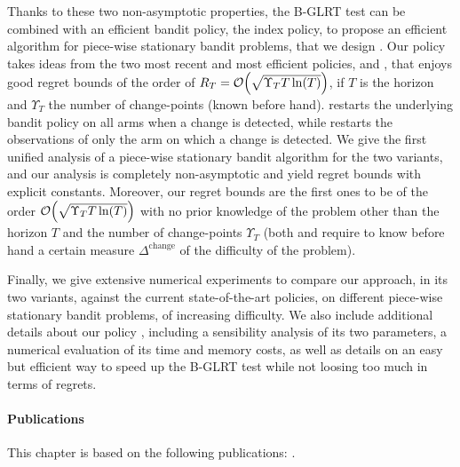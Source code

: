 Thanks to these two non-asymptotic properties, the B-GLRT test can be combined with an efficient bandit policy, the \klUCB{} index policy, to propose an efficient algorithm for piece-wise stationary bandit problems, that we design \GLRklUCB.
Our policy takes ideas from the two most recent and most efficient policies, \CUSUMUCB{} and \MUCB, that enjoys good regret bounds of the order of $R_T = \mathop{}\mathopen{}\mathcal{O}\mathopen{}\left(\sqrt{\Upsilon_T T \ln(T)}\right)$, if $T$ is the horizon and $\Upsilon_T$ the number of change-points (known before hand).
\MUCB{} restarts the underlying \UCB{} bandit policy on all arms when a change is detected, while \CUSUMUCB{} restarts the observations of only the arm on which a change is detected.
%
We give the first unified analysis of a piece-wise stationary bandit algorithm for the two variants, and our analysis is completely non-asymptotic and yield regret bounds with explicit constants.
Moreover, our regret bounds are the first ones to be of the order $\mathop{}\mathopen{}\mathcal{O}\mathopen{}\left(\sqrt{\Upsilon_T T \ln(T)}\right)$ with no prior knowledge of the problem other than the horizon $T$ and the number of change-points $\Upsilon_T$ (both \MUCB{} and \CUSUMUCB{} require to know before hand a certain measure $\Delta^{\text{change}}$ of the difficulty of the problem).

Finally, we give extensive numerical experiments to compare our approach, in its two variants, against the current state-of-the-art policies, on different piece-wise stationary bandit problems, of increasing difficulty.
%
We also include additional details about our policy \GLRklUCB, including a sensibility analysis of its two parameters, a numerical evaluation of its time and memory costs, as well as details on an easy but efficient way to speed up the B-GLRT test while not loosing too much in terms of regrets.



\paragraph{Publications}

This chapter is based on the following publications: \cite{Besson2019GLRT,Besson2019Gretsi}.


\graphicspath{{2-Chapters/6-Chapter/Images/}}


